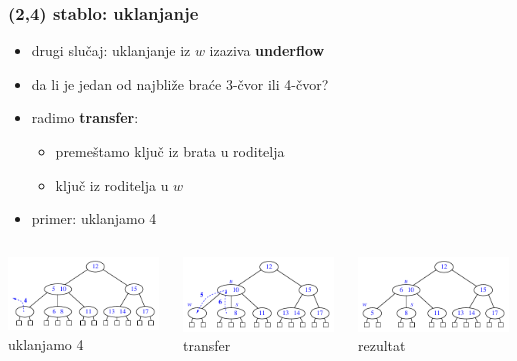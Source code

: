 \documentclass[compress]{beamer}
\begin{document}
\begin{frame}[fragile]
  \frametitle{(2,4) stablo: uklanjanje}
  \begin{itemize}
    \item drugi slučaj: uklanjanje iz $w$ izaziva \textbf{underflow}
    \item da li je jedan od najbliže braće 3-čvor ili 4-čvor?
    \item radimo \textbf{transfer}:
    \begin{itemize}
      \item premeštamo ključ iz brata u roditelja
      \item ključ iz roditelja u $w$
    \end{itemize}
    \item primer: uklanjamo 4
  \end{itemize}
  \begin{columns}
    \begin{column}[c]{4cm}
      \begin{center}
        \includegraphics[width=4cm]{asp-11-pic35a.pdf}
      \\ uklanjamo 4
      \end{center}
    \end{column}
    \begin{column}[c]{4cm}
      \begin{center}
        \includegraphics[width=4cm]{asp-11-pic35b.pdf}
      \\ transfer
      \end{center}
    \end{column}
    \begin{column}[c]{4cm}
      \begin{center}
        \includegraphics[width=4cm]{asp-11-pic35c.pdf}
      \\ rezultat
      \end{center}
    \end{column}
  \end{columns}
\end{frame}
\end{document}
